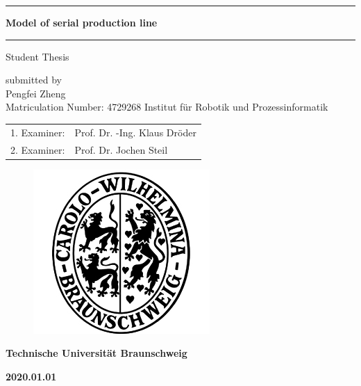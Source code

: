 \documentclass[ifn,english,masterarbeit,pdf,cd]{report}
\begin{document}
\large {}
\begin{titlepage}
    \setcounter{page}{1}
    \let\footnotesize\small
    \let\footnoterule\relax
    \headsep 1.5cm
    \vskip -2cm
    \begin{center}
    	\rule[1\baselineskip]{\textwidth}{1pt}
    	\LARGE\bf Model of serial production line
    	\baselineskip
    	\rule[1\baselineskip]{\textwidth}{1pt}
    \end{center}   
    \begin{center}        
               {\Large{Student Thesis\\}\par}
                \vskip 0.25cm
                {\large submitted by\\}
                \vskip 0.25cm
                {\Large Pengfei Zheng\\ \large Matriculation Number: 4729268}
                \vskip 0.8cm
                {\large Institut f\"{u}r Robotik und Prozessinformatik}                       
    \end{center}
\linespread{1.5}
\begin{table}[!h]
	\centering	
	\begin{tabular}{rl}
		\large	1. Examiner:& \large Prof. Dr. -Ing. Klaus Dr\"{o}der \\
		\large2. Examiner:& \large Prof. Dr. Jochen Steil \\
	\end{tabular}
\end{table}
    \begin{figure}[!h]
        \begin{center}
            \includegraphics[width=0.3\linewidth]{carolo.jpg}
        \end{center}
    \end{figure}
\centerline{\large\bf Technische Universit\"{a}t Braunschweig}
\vskip 1cm
\centerline{\large\bf 2020.01.01}

\end{titlepage}
\end{document}
